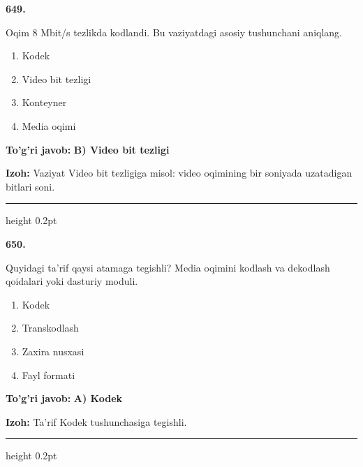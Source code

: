 \documentclass[10pt,a4paper,oneside]{article}
\begin{document}
\noindent\textbf{\color{ink}649.}
\par
Oqim 8 Mbit/s tezlikda kodlandi. Bu vaziyatdagi asosiy tushunchani aniqlang.
\begin{enumerate}[label=\Alph*),leftmargin=9mm]
\item Kodek
\item Video bit tezligi
\item Konteyner
\item Media oqimi
\end{enumerate}
\begin{tcolorbox}[enhanced,breakable,colback=teal!4,colframe=teal!50!black,boxrule=0.5pt,arc=1.1mm,left=3mm,right=3mm,top=1.7mm,bottom=1.7mm,before skip=2mm,after skip=2mm]
\textbf{\color{teal}To'g'ri javob:} \textbf{B) Video bit tezligi}
\par\smallskip
\textbf{Izoh:} Vaziyat Video bit tezligiga misol: video oqimining bir soniyada uzatadigan bitlari soni.
\end{tcolorbox}
\vspace{2mm}\hrule height 0.2pt \vspace{3mm}

\noindent\textbf{\color{ink}650.}
\par
Quyidagi ta'rif qaysi atamaga tegishli? Media oqimini kodlash va dekodlash qoidalari yoki dasturiy moduli.
\begin{enumerate}[label=\Alph*),leftmargin=9mm]
\item Kodek
\item Transkodlash
\item Zaxira nusxasi
\item Fayl formati
\end{enumerate}
\begin{tcolorbox}[enhanced,breakable,colback=teal!4,colframe=teal!50!black,boxrule=0.5pt,arc=1.1mm,left=3mm,right=3mm,top=1.7mm,bottom=1.7mm,before skip=2mm,after skip=2mm]
\textbf{\color{teal}To'g'ri javob:} \textbf{A) Kodek}
\par\smallskip
\textbf{Izoh:} Ta'rif Kodek tushunchasiga tegishli.
\end{tcolorbox}
\vspace{2mm}\hrule height 0.2pt \vspace{3mm}
\end{document}
